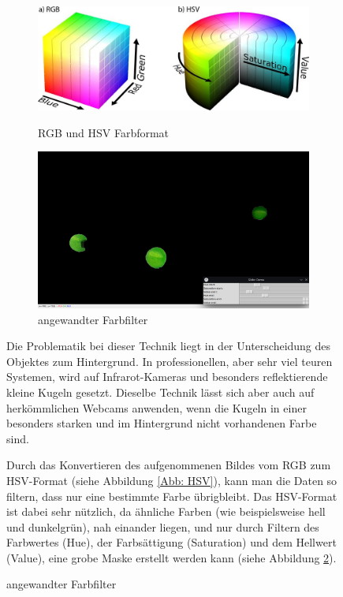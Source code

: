 \documentclass[12pt, ngerman]{article}
\begin{document}
\vspace{10pt}
\begin{figure}[H]
  \begin{figure}
    \includegraphics[angle=0,width=\linewidth]{rgb-hsv.png}
    \caption{RGB und HSV Farbformat}
    \label{Abb: HSV}
    \includegraphics[angle=0,width=\linewidth]{2d-normal-filter.jpg}
    \caption{angewandter Farbfilter}
    \label{Abb: Farbfilter}
  \end{figure}
  Die Problematik bei dieser Technik liegt in der Unterscheidung des Objektes zum Hintergrund. In professionellen, aber sehr viel teuren Systemen, wird auf Infrarot-Kameras und besonders reflektierende kleine Kugeln gesetzt. Dieselbe Technik lässt sich aber auch auf herkömmlichen Webcams anwenden, wenn die Kugeln in einer besonders starken und im Hintergrund nicht vorhandenen Farbe sind. 

  Durch das Konvertieren des aufgenommenen Bildes vom RGB zum HSV-Format (siehe Abbildung \ref{Abb: HSV}), kann man die Daten so filtern, dass nur eine bestimmte Farbe übrigbleibt. Das HSV-Format ist dabei sehr nützlich, da ähnliche Farben (wie beispielsweise hell und dunkelgrün), nah einander liegen, und nur durch Filtern des Farbwertes (Hue), der Farbsättigung (Saturation) und dem Hellwert (Value), eine grobe Maske erstellt werden kann (siehe Abbildung \ref{Abb: Farbfilter}). 
\end{figure}
\end{document}
